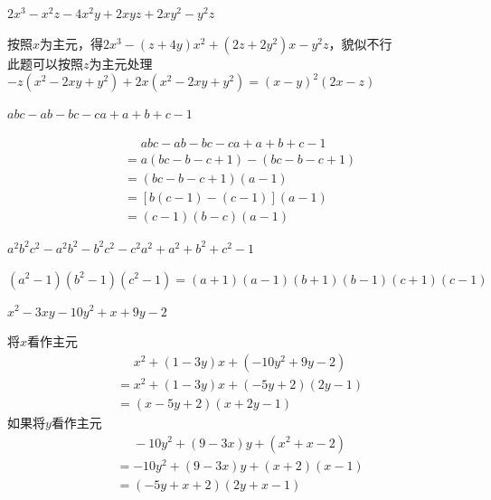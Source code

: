 \documentclass[windows,csize4]{BHCexam}
\begin{document}
\begin{groups}
    \begin{questions}[]
        \question[5]$2x^3-x^2z-4x^2y+2xyz+2xy^2-y^2z$
        \begin{solution}{0.5cm}
            \methodonly 按照$x$为主元，得$2x^3-(z+4y)x^2+(2z+2y^2)x-y^2z$，貌似不行 \\
            此题可以按照$z$为主元处理 \\
            $-z(x^2-2xy+y^2)+2x(x^2-2xy+y^2)=(x-y)^2(2x-z)$
        \end{solution}
        \vspace{3.5cm}

        \question[5]$abc-ab-bc-ca+a+b+c-1$
        \begin{solution}{0.5cm}
            \methodonly
            \[
                \begin{aligned}
                     & \phantom{=}abc-ab-bc-ca+a+b+c-1 \\
                     & =a(bc-b-c+1)-(bc-b-c+1)         \\
                     & =(bc-b-c+1)(a-1)                \\
                     & =[b(c-1)-(c-1)](a-1)            \\
                     & =(c-1)(b-c)(a-1)
                \end{aligned}
            \]
        \end{solution}
        \vspace{3.5cm}

        \question[5]$a^2b^2c^2-a^2b^2-b^2c^2-c^2a^2+a^2+b^2+c^2-1$
        \begin{solution}{0.5cm}
            \methodonly $(a^2-1)(b^2-1)(c^2-1)=(a+1)(a-1)(b+1)(b-1)(c+1)(c-1)$
        \end{solution}
        \vspace{3.5cm}

        \question[5]$x^2-3xy-10y^2+x+9y-2$
        \begin{solution}{0.5cm}
            \methodonly 将$x$看作主元
            \[
                \begin{aligned}
                     & \phantom{=}x^2+(1-3y)x+(-10y^2+9y-2) \\
                     & =x^2+(1-3y)x+(-5y+2)(2y-1)           \\
                     & =(x-5y+2)(x+2y-1)
                \end{aligned}
            \]
            如果将$y$看作主元
            \[
                \begin{aligned}
                     & \phantom{=}-10y^2+(9-3x)y+(x^2+x-2) \\
                     & =-10y^2+(9-3x)y+(x+2)(x-1)          \\
                     & =(-5y+x+2)(2y+x-1)
                \end{aligned}
            \]
        \end{solution}
        \vspace{3.5cm}


\end{questions}
\end{groups}
\end{document}
